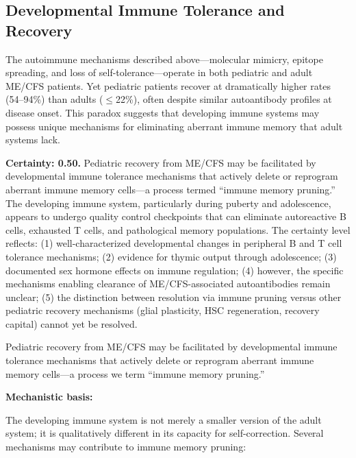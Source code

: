 \subsection{Developmental Immune Tolerance and Recovery}
\label{sec:developmental-tolerance}

The autoimmune mechanisms described above---molecular mimicry, epitope spreading, and loss of self-tolerance---operate in both pediatric and adult ME/CFS patients. Yet pediatric patients recover at dramatically higher rates (54--94\%) than adults ($\leq$22\%), often despite similar autoantibody profiles at disease onset. This paradox suggests that developing immune systems may possess unique mechanisms for eliminating aberrant immune memory that adult systems lack.

\begin{hypothesis}
\label{hyp:immune-pruning}

\textbf{Certainty: 0.50.} Pediatric recovery from ME/CFS may be facilitated by developmental immune tolerance mechanisms that actively delete or reprogram aberrant immune memory cells---a process termed ``immune memory pruning.'' The developing immune system, particularly during puberty and adolescence, appears to undergo quality control checkpoints that can eliminate autoreactive B cells, exhausted T cells, and pathological memory populations. The certainty level reflects: (1) well-characterized developmental changes in peripheral B and T cell tolerance mechanisms; (2) evidence for thymic output through adolescence; (3) documented sex hormone effects on immune regulation; (4) however, the specific mechanisms enabling clearance of ME/CFS-associated autoantibodies remain unclear; (5) the distinction between resolution via immune pruning versus other pediatric recovery mechanisms (glial plasticity, HSC regeneration, recovery capital) cannot yet be resolved.

Pediatric recovery from ME/CFS may be facilitated by developmental immune tolerance mechanisms that actively delete or reprogram aberrant immune memory cells---a process we term ``immune memory pruning.''

\textbf{Mechanistic basis:}

The developing immune system is not merely a smaller version of the adult system; it is qualitatively different in its capacity for self-correction. Several mechanisms may contribute to immune memory pruning:


\end{hypothesis}
